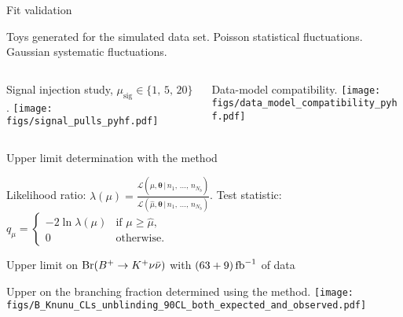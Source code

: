 \begin{frame}[noframenumbering]{Fit validation}
\bi
\item Toys  generated  for  the simulated data set.
\bi
\itemii Poisson statistical fluctuations.
\itemii Gaussian systematic fluctuations.
\ei
\ei
\vspace{0.25cm}
\begin{columns}
\begin{column}{0.5\linewidth}
\bi
\item {\scriptsize Signal injection study, $\mu_{\mathrm{sig}}\in\{1,\,5,\,20\}$}.
\ei
\centering
\texttt{[image: figs/signal\_pulls\_pyhf.pdf]}
\end{column}
\begin{column}{0.5\linewidth}
\bi
\item {\scriptsize Data-model compatibility.}
\ei
\centering
\texttt{[image: figs/data\_model\_compatibility\_pyhf.pdf]}
\end{column}
\end{columns}
\end{frame}
\begin{frame}[noframenumbering]{Upper limit determination with the \CLs method}
\bi
\item Likelihood ratio: $
\lambda(\mu)=
\frac{\mathcal{L}(\mu,\boldsymbol{\hat{\hat{\theta}}}\,|\,n_1,\,...,\,n_{N_b})}
{\mathcal{L}(\hat{\mu},\boldsymbol{\hat{\theta}}\,|\,n_1,\,...,\,n_{N_b})}$.
\itemii Test statistic: $
q_\mu=
\begin{cases}
-2\ln\lambda(\mu) & \text{if } \mu\ge\hat{\mu}, \\
0 & \text{otherwise}.
\end{cases}
$
\bi
{}
\ei
{}
\bi
{}
\ei
{}
\ei
\end{frame}
\begin{frame}[noframenumbering]{Upper limit on $\mathrm{Br}(B^+\rightarrow K^+\nu\bar{\nu})$ with $(63+9)\mbox{\,fb}^{-1}$ of data}
\bi
\item Upper on the branching fraction determined using the \CLs method.
\ei
\vspace{0.5cm}
\centering
\texttt{[image: figs/B\_Knunu\_CLs\_unblinding\_90CL\_both\_expected\_and\_observed.pdf]}
\end{frame}

